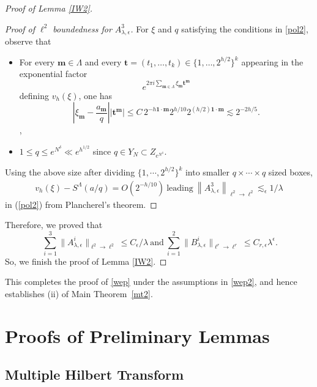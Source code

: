 \documentclass[10pt,a4paper]{amsart}
\numberwithin{equation}{section}
\begin{document}
\begin{proof}[Proof of Lemma \ref{IW2}]
	\begin{proof}[Proof of $\ell^2$ boundedness for $A_{\lambda, \epsilon}^{3}$]
	For $\xi$ and $q$ satisfying the conditions in \eqref{pol2},  observe that \begin{itemize} \item For every $\mathbf{m}\in\Lambda$ and every
		$\mathbf{t}=(t_1,\ldots,t_k)\in\{1,\ldots,2^{h/2}\}^k$
		appearing in the exponential factor
		\[
		e^{2\pi i\sum_{\mathbf{m}\in\Lambda}
			\xi_{\mathbf{m}}\mathbf{t}^{\mathbf{m}}}
		\]
		defining $v_h(\xi)$, one has
		\[
		\left|
		\xi_{\mathbf{m}}-\frac{a_{\mathbf{m}}}{q}
		\right|
		\left|\mathbf{t}^{\mathbf{m}}\right|
		\leq
		C\,2^{-h\mathbf{1}\cdot\mathbf{m}}
		2^{h/10}
		2^{(h/2)\mathbf{1}\cdot\mathbf{m}}
		\lesssim
		2^{-2h/5}.
		\], 
		 \item  $ 1\leq q\leq e^{N^\delta}\ll e^{h^{1/2}} $  since $q\in Y_N\subset Z_{e^{N^\delta}}.$ \end{itemize}	
		Using the above size   after dividing $\{1,\cdots,2^{h/2}\}^k$ into smaller $q\times\cdots\times q$ sized boxes,  \begin{align*} 
			v_{h}(\xi)-S^{\Lambda}(a / q)=O(2^{-h/10})\ \text{leading} \  \left\|A_{\lambda, \epsilon}^{3}\right\|_{\ell^{2} \rightarrow \ell^{2}} \lesssim_{\epsilon}1/\lambda 
		\end{align*}  
in (\ref{pol2})
		from Plancherel's theorem. 
	\end{proof}
	Therefore, we proved that
	$$
	\ \sum_{i=1}^3\|A_{\lambda, \epsilon}^{i}\|_{\ell^2\rightarrow \ell^2}\le  C_{\epsilon} / \lambda\ \text{and}\ \sum_{i=1}^2\| B_{\lambda, \epsilon}^{i} \|_{\ell^r\rightarrow \ell^r}\le   C_{r,\epsilon}\lambda^{\epsilon}. $$
	So, we  finish the proof of Lemma \ref{IW2}.
\end{proof}  

This completes the proof of \eqref{wep} under the assumptions in \eqref{wep2}, and hence establishes (ii) of Main Theorem~\ref{mt2}.


  

 



\section{Proofs of Preliminary Lemmas}\label{PPL}
\subsection{Multiple Hilbert Transform}\label{MHT}
\end{document}
